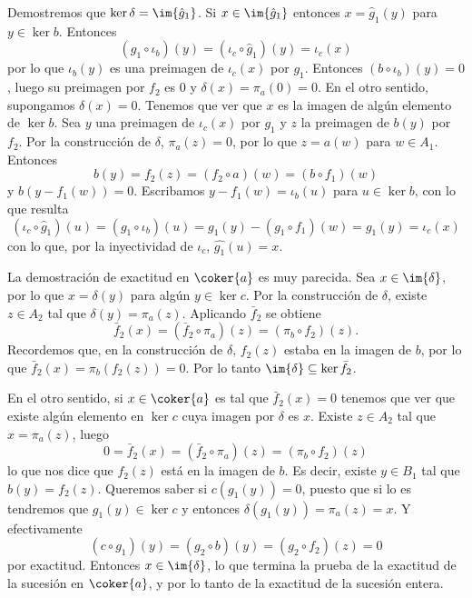 \documentclass[12pt]{article}
\begin{document}
Demostremos que \( \ker{\delta} = \im{\hat{g}_1} \). Si \( x \in \im{\hat{g}_1} \)
entonces \( x = \hat{g}_1(y) \) para \( y \in \ker{b} \). Entonces
\begin{equation*}
	(g_1 \circ \iota_b)(y) = (\iota_c \circ \hat{g}_1)(y) = \iota_c(x)
\end{equation*}
por lo que \( \iota_b(y) \) es una preimagen de \( \iota_c(x) \) por \( g_1 \). Entonces
\( (b \circ \iota_b)(y) = 0 \), luego su preimagen por \( f_2 \) es 0 y \( \delta(x) =
\pi_a(0) = 0 \). En el otro sentido, supongamos \( \delta(x) = 0 \). Tenemos que ver que
\( x \) es la imagen de algún elemento de \( \ker{b} \). Sea \( y \) una preimagen de \(
\iota_c(x) \) por \( g_1 \) y \( z \) la preimagen de \( b(y) \) por \( f_2 \). Por
la construcción de \( \delta \), \( \pi_a(z) = 0 \), por lo que \( z = a(w) \) para \( w
\in A_1 \). Entonces
\begin{equation*}
	b(y) = f_2(z) = (f_2 \circ a)(w) = (b \circ f_1)(w)
\end{equation*}
y \( b(y - f_1(w)) = 0 \). Escribamos \( y - f_1(w) = \iota_b(u) \) para \( u \in \ker{b}
\), con lo que resulta
\begin{equation*}
	(\iota_c \circ \hat{g}_1)(u) = (g_1 \circ \iota_b)(u) = g_1(y) - (g_1 \circ f_1)(w) =
	g_1(y) = \iota_c(x)
\end{equation*}
con lo que, por la inyectividad de \( \iota_c \), \( \hat{g_1}(u) = x \).

La demostración de exactitud en \( \coker{a} \) es muy parecida. Sea \( x \in \im{\delta}
\), por lo que \( x = \delta(y) \) para algún \( y \in \ker{c} \). Por la construcción de
\( \delta \), existe \( z \in A_2 \) tal que \( \delta(y) = \pi_a(z) \). Aplicando \(
\bar{f}_2 \) se obtiene
\begin{equation*}
	\bar{f}_2(x) = (\bar{f}_2 \circ \pi_a)(z) = (\pi_b \circ f_2)(z).
\end{equation*}
Recordemos que, en la construcción de \( \delta \), \( f_2(z) \) estaba en la imagen de	\(
b \), por lo que \( \bar{f}_2(x) = \pi_b(f_2(z)) = 0 \). Por lo tanto \( \im{\delta} \subseteq
\ker{\bar{f}_2} \).

En el otro sentido, si \( x \in \coker{a} \) es tal que \( \bar{f}_2(x) = 0 \) tenemos que
ver que existe algún elemento en \( \ker{c} \) cuya imagen por \( \delta \) es \( x \).
Existe \( z \in A_2 \) tal que \( x = \pi_a(z) \), luego
\begin{equation*}
	0 = \bar{f}_2(x) = (\bar{f}_2 \circ \pi_a)(z) = (\pi_b \circ f_2)(z)
\end{equation*}
lo que nos dice que \( f_2(z) \) está en la imagen de \( b \). Es decir, existe \( y \in
B_1 \) tal que \( b(y) = f_2(z) \). Queremos saber si \( c(g_1(y)) = 0 \), puesto que si
lo es tendremos que \( g_1(y) \in \ker{c} \) y entonces \( \delta(g_1(y)) = \pi_a(z) = x
\). Y efectivamente
\begin{equation*}
	(c \circ g_1)(y) = (g_2 \circ b)(y) = (g_2 \circ f_2)(z) = 0
\end{equation*}
por exactitud. Entonces \( x \in \im{\delta} \), lo que termina la prueba de la exactitud
de la sucesión en \( \coker{a} \), y por lo tanto de la exactitud de la sucesión entera.
\end{document}
